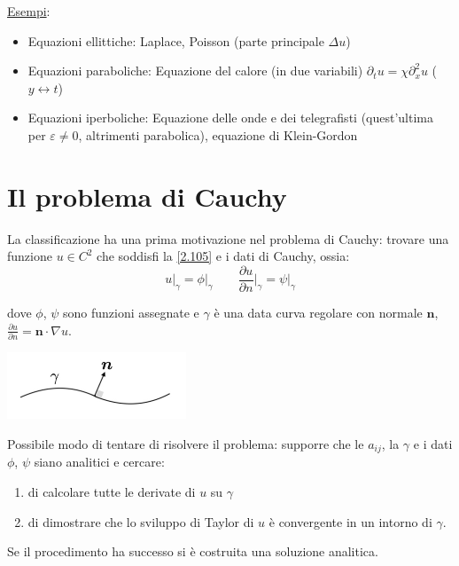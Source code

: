 \documentclass[a4paper,11pt]{report}
\newcommand{\vect}[1]{\boldsymbol{#1}}
\begin{document}
\medskip

\underline{Esempi}:

\begin{itemize}
\item Equazioni ellittiche: Laplace, Poisson (parte principale $\Delta u$)
\item Equazioni paraboliche: Equazione del calore (in due variabili) $\partial_t u = \chi \partial_x^2 u$ ($y \leftrightarrow t$)
\item Equazioni iperboliche: Equazione delle onde e dei telegrafisti (quest'ultima per $\varepsilon \neq 0$, altrimenti parabolica), equazione di Klein-Gordon
\end{itemize}

\section{Il problema di Cauchy}

La classificazione ha una prima motivazione nel problema di Cauchy: trovare una funzione $u\in C^2$ che soddisfi la \eqref{2.105} e i dati di Cauchy, ossia:
\begin{equation}
u \big|_{\gamma}=\phi \big|_{\gamma} \qquad \frac{\partial u}{\partial n} \Big|_{\gamma}=\psi \big|_{\gamma}
\label{2.109}
\end{equation}

dove $\phi$, $\psi$ sono funzioni assegnate e $\gamma$ \`e una data curva regolare con normale $\vect{n}$, \mbox{$\frac{\partial u}{\partial n}=\vect{n}\cdot \nabla u$}.
\begin{center}
\includegraphics[width=0.4\textwidth]{immagini/curva1}
\end{center}

Possibile modo di tentare di risolvere il problema: supporre che le $a_{ij}$, la $\gamma$ e i dati $\phi$, $\psi$ siano analitici e cercare:
\begin{enumerate}[label=(\roman*)]
\item di calcolare tutte le derivate di $u$ su $\gamma$
\item di dimostrare che lo sviluppo di Taylor di $u$ \`e convergente in un intorno di $\gamma$.
\end{enumerate}
Se il procedimento ha successo si \`e costruita una soluzione analitica.
\end{document}

